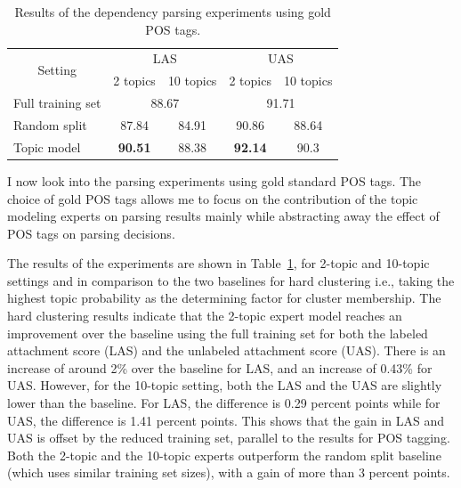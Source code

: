 \begin{table}[t!]
	\centering
	\begin{tabular}{l|cc|cc}
		\multicolumn{1}{c|}{\multirow{2}{*}{Setting}} & \multicolumn{2}{c|}{LAS}                                      & \multicolumn{2}{c}{UAS}                                     \\
		\multicolumn{1}{c|}{}                         & \multicolumn{1}{l}{2 topics} & \multicolumn{1}{r|}{10 topics} & \multicolumn{1}{l}{2 topics} & \multicolumn{1}{r}{10 topics} \\ \hline
		Full training set                             & \multicolumn{2}{c|}{88.67}                                    & \multicolumn{2}{c}{91.71}                                   \\
		Random split                                  & 87.84                        & 84.91                          & 90.86                        & 88.64                         \\
		Topic model                                   & \textbf{90.51}               & 88.38                          & \textbf{92.14}               & 90.3                          \\ \hline
	\end{tabular}
	\caption{Results of the dependency parsing experiments using gold POS tags.}
	\label{tab:tmvsfs}
\end{table}

I now look into the parsing experiments using gold standard POS tags. The choice of gold POS tags allows me to focus on the contribution of the topic modeling experts on parsing results mainly while abstracting away the effect of POS tags on parsing decisions. 

The results of the experiments are shown in Table~\ref{tab:tmvsfs}, for 2-topic and 10-topic settings and in comparison to the two baselines for hard clustering i.e., taking the highest topic probability as the determining factor for cluster membership. %
The hard clustering results indicate that the 2-topic expert model reaches an improvement over the baseline using the full training set for both the labeled attachment score (LAS) and the unlabeled attachment score (UAS). There is an increase of around 2\% over the baseline for LAS, and an increase of 0.43\% for UAS. However, for the 10-topic setting, both the LAS and the UAS are slightly lower than the baseline. For LAS, the difference is 0.29 percent points while for UAS, the difference is 1.41 percent points. This shows that the gain in LAS and UAS is offset by the reduced training set, parallel to the results for POS tagging. Both the 2-topic and the 10-topic experts outperform the random split baseline (which uses similar training set sizes), with a gain of more than 3 percent points.

